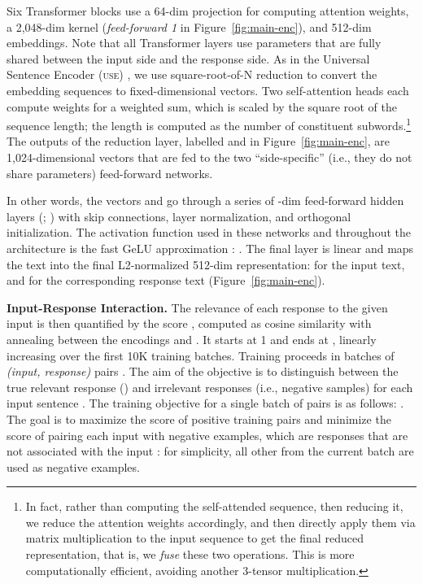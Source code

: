 \documentclass[11pt,a4paper]{article}
\begin{document}
Six Transformer blocks use a 64-dim projection for computing attention weights, a 2,048-dim kernel (\textit{feed-forward 1} in Figure~\ref{fig:main-enc}), and 512-dim embeddings. Note that all Transformer layers use parameters that are fully shared between the input side and the response side. As in the Universal Sentence Encoder (\textsc{use}) \cite{Cer:2018arxiv}, we use square-root-of-N reduction to convert the embedding sequences to fixed-dimensional vectors. Two self-attention heads each compute weights for a weighted sum, which is scaled by the square root of the sequence length; the length is computed as the number of constituent subwords.\footnote{In fact, rather than computing the self-attended sequence, then reducing it, we reduce the attention weights accordingly, and then directly apply them via matrix multiplication to the input sequence to get the final reduced representation, that is, we \emph{fuse} these two operations. This is more computationally efficient, avoiding another 3-tensor multiplication.} The outputs of the reduction layer, labelled  and  in Figure~\ref{fig:main-enc}, are 1,024-dimensional vectors that are fed to the two ``side-specific'' (i.e., they do not share parameters) feed-forward networks.

In other words, the vectors  and  go through a series of  -dim feed-forward hidden layers (; ) with skip connections, layer normalization, and orthogonal initialization. The activation function used in these networks and throughout the architecture is the fast GeLU approximation \cite{hendrycks2016gelu}: . The final layer is linear and maps the text into the final L2-normalized 512-dim representation:  for the input text, and  for the corresponding response text (Figure~\ref{fig:main-enc}).

\vspace{1.4mm}
\noindent \textbf{Input-Response Interaction.}
The relevance of each response to the given input is then quantified by the score , computed as cosine similarity with annealing between the encodings  and . It starts at 1 and ends at , linearly increasing over the first 10K training batches. Training proceeds in batches of  \textit{(input, response)} pairs . The aim of the objective is to distinguish between the true relevant response () and irrelevant responses (i.e., negative samples)  for each input sentence . The training objective for a single batch of  pairs is as follows: . The goal is to maximize the score of positive training pairs  and minimize the score of pairing each input  with  negative examples, which are responses that are not associated with the input : for simplicity, all other  from the current batch are used as negative examples.
\end{document}
